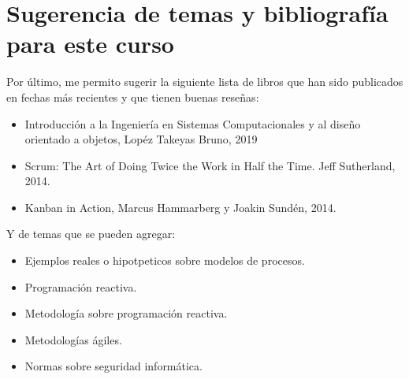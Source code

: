 \documentclass[12pt,twoside]{article}
\begin{document}
\section{Sugerencia de temas y bibliografía para este curso}
Por último, me permito sugerir la siguiente lista de libros que han sido publicados en 
fechas más recientes y que tienen buenas reseñas:
\begin{itemize}
    \item Introducción a la Ingeniería en Sistemas Computacionales y al diseño orientado a objetos, 
    Lopéz Takeyas Bruno, 2019
    \item Scrum: The Art of Doing Twice the Work in Half the Time. Jeff Sutherland, 2014.
    \item Kanban in Action, Marcus Hammarberg y Joakin Sundén, 2014.
\end{itemize}

Y de temas que se pueden agregar:
\begin{itemize}
    \item Ejemplos reales o hipotpeticos sobre modelos de procesos.
    \item Programación reactiva.
    \item Metodología sobre programación reactiva.
    \item Metodologías ágiles.
    \item Normas sobre seguridad informática.
\end{itemize}
\end{document}
